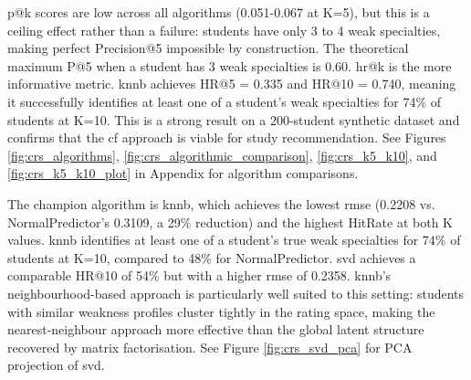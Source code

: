 \gls{p@k} scores are low across all algorithms (0.051-0.067 at K=5), but this is a ceiling effect rather than a failure: students have only 3 to 4 weak specialties, making perfect Precision@5 impossible by construction. The theoretical maximum P@5 when a student has 3 weak specialties is 0.60. \gls{hr@k} is the more informative metric. \gls{knnb} achieves HR@5 = 0.335 and HR@10 = 0.740, meaning it successfully identifies at least one of a student's weak specialties for 74\% of students at K=10. This is a strong result on a 200-student synthetic dataset and confirms that the \gls{cf} approach is viable for study recommendation. See Figures \ref{fig:crs_algorithms}, \ref{fig:crs_algorithmic_comparison}, \ref{fig:crs_k5_k10}, and \ref{fig:crs_k5_k10_plot} in Appendix for algorithm comparisons.

The champion algorithm is \gls{knnb}, which achieves the lowest \gls{rmse} (0.2208 vs. NormalPredictor's 0.3109, a 29\% reduction) and the highest HitRate at both K values. \gls{knnb} identifies at least one of a student's true weak specialties for 74\% of students at K=10, compared to 48\% for NormalPredictor. \gls{svd} achieves a comparable HR@10 of 54\% but with a higher \gls{rmse} of 0.2358. \gls{knnb}'s neighbourhood-based approach is particularly well suited to this setting: students with similar weakness profiles cluster tightly in the rating space, making the nearest-neighbour approach more effective than the global latent structure recovered by matrix factorisation. See Figure \ref{fig:crs_svd_pca} for PCA projection of \gls{svd}.